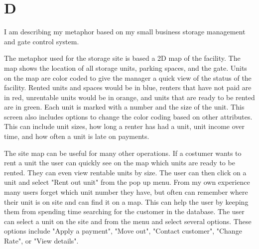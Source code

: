 \documentclass[12pt]{article}
\begin{document}
\section*{D}

I am describing my metaphor based on my small business storage management 
and gate control system.

The metaphor used for the storage site is based a 2D map of the facility.
The map shows the location of all storage units, parking spaces, and the 
gate.  Units on the map are color coded to give the manager a quick view
of the status of the facility.  Rented units and spaces would be in blue,
renters that have not paid are in red, unrentable units would be in orange,
and units that are ready to be rented are in green.  Each unit is marked 
with a number and the size of the unit.  This screen also includes options
to change the color coding based on other attributes.  This can include 
unit sizes, how long a renter has had a unit, unit income over time, and
how often a unit is late on payments.

The site map can be useful for many other operations.  If a costumer wants 
to rent a unit the user can quickly see on the map which units are ready
to be rented.  They can even view rentable units by size.  The user can 
then click on a unit and select "Rent out unit" from the pop up menu.  From
my own experience many users forget which unit number they have, but often
can remember where their unit is on site and can find it on a map.  This
can help the user by keeping them from spending time searching for the
customer in the database.  The user can select a unit on the site and from
the menu and select several options.  These options include "Apply a
payment", "Move out", "Contact customer", "Change Rate", or "View details".
\end{document}
